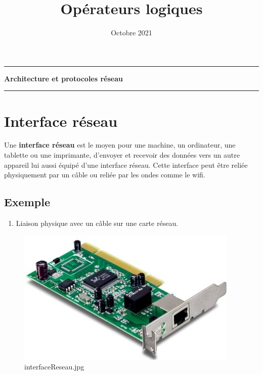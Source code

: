 \documentclass[11pt]{article}
\title{Opérateurs logiques}
\date{Octobre 2021}
\makeatletter
\providecommand{\tightlist}{%
      \setlength{\itemsep}{0pt}\setlength{\parskip}{0pt}}
\renewcommand\maketitle[1]{
\hrule\medskip
{\raggedright %
\begin{center}
{\Huge \bfseries \sffamily #1 }\\[4ex] 
\hrule \bigskip
\end{center}}} %
\makeatother
\begin{document}
    
    \maketitle{Architecture et protocoles
réseau}
    

   

    \hypertarget{interface-ruxe9seau}{%
\section{Interface réseau}\label{interface-ruxe9seau}}

Une \textbf{interface réseau} est le moyen pour une machine, un
ordinateur, une tablette ou une imprimante, d'envoyer et recevoir des
données vers un autre appareil lui aussi équipé d'une interface réseau.
Cette interface peut être reliée physiquement par un câble ou reliée par
les ondes comme le wifi.

\hypertarget{exemple}{%
\subsection{Exemple}\label{exemple}}

\begin{enumerate}
\def\labelenumi{\arabic{enumi}.}
\tightlist
\item
  Liaison physique avec un câble sur une carte réseau.
\end{enumerate}

    \begin{figure}
\centering
\includegraphics{img/interfaceReseau.jpg}
\caption{interfaceReseau.jpg}
\end{figure}
\end{document}
